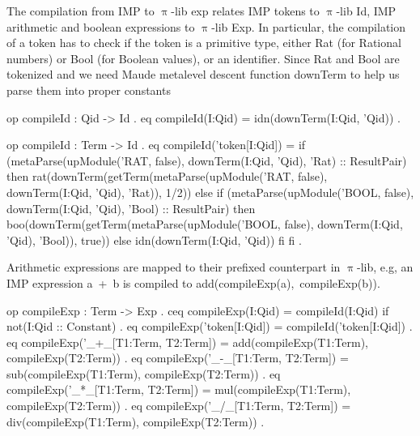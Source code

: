 \documentclass{llncs}%
\begin{document}
The compilation from IMP to $\uppi$-lib exp relates IMP tokens to $\uppi$-lib Id, IMP arithmetic and boolean expressions to $\uppi$-lib Exp. In particular, the compilation of a {\Tt{}token\nwendquote} has to check if the token is a primitive type, either {\Tt{}Rat\nwendquote} (for Rational numbers) or {\Tt{}Bool\nwendquote} (for Boolean values), or an identifier. Since {\Tt{}Rat\nwendquote} and {\Tt{}Bool\nwendquote} are tokenized and we need Maude metalevel descent function {\Tt{}downTerm\nwendquote} to help us parse them into proper constants
 
\begin{maude}
 op compileId : Qid -> Id .
 eq compileId(I:Qid) = idn(downTerm(I:Qid, 'Qid)) .

 op compileId : Term -> Id .
 eq compileId('token[I:Qid]) =
    if (metaParse(upModule('RAT, false), 
         downTerm(I:Qid, 'Qid), 'Rat)  :: ResultPair)
        then rat(downTerm(getTerm(metaParse(upModule('RAT, false),
              downTerm(I:Qid, 'Qid), 'Rat)), 1/2))
    else
     if (metaParse(upModule('BOOL, false), 
          downTerm(I:Qid, 'Qid), 'Bool) :: ResultPair)
     then boo(downTerm(getTerm(metaParse(upModule('BOOL, false),
                   downTerm(I:Qid, 'Qid), 'Bool)), true))
     else idn(downTerm(I:Qid, 'Qid))
     fi
    fi .
\end{maude}

Arithmetic expressions are mapped to their prefixed counterpart in $\uppi$-lib, e.g, an IMP expression {\Tt{}a\ +\ b\nwendquote} is compiled to {\Tt{}add(compileExp(a),\ compileExp(b))\nwendquote}.
\begin{maude}
 op compileExp : Term -> Exp .
 ceq compileExp(I:Qid) = compileId(I:Qid) 
  if not(I:Qid :: Constant) .
 eq compileExp('token[I:Qid]) = compileId('token[I:Qid]) .
 eq compileExp('_+_[T1:Term, T2:Term]) =
     add(compileExp(T1:Term), compileExp(T2:Term)) .
 eq compileExp('_-_[T1:Term, T2:Term]) =
     sub(compileExp(T1:Term), compileExp(T2:Term)) .
 eq compileExp('_*_[T1:Term, T2:Term]) =
     mul(compileExp(T1:Term), compileExp(T2:Term)) .
 eq compileExp('_/_[T1:Term, T2:Term]) =
     div(compileExp(T1:Term), compileExp(T2:Term)) .
\end{maude}

% 
%
\end{document}
